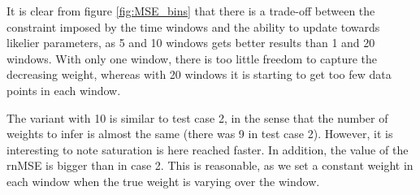 It is clear from figure \ref{fig:MSE_bins} that there is a trade-off between the constraint imposed by the time windows and the ability to update towards likelier parameters, as 5 and 10 windows gets better results than 1 and 20 windows. With only one window, there is too little freedom to capture the decreasing weight, whereas with 20 windows it is starting to get too few data points in each window. 

The variant with 10 is similar to test case 2, in the sense that the number of weights to infer is almost the same (there was 9 in test case 2). However, it is interesting to note saturation is here reached faster. In addition, the value of the rnMSE is bigger than in case 2. This is reasonable, as we set a constant weight in each window when the true weight is varying over the window. 





\cleardoublepage